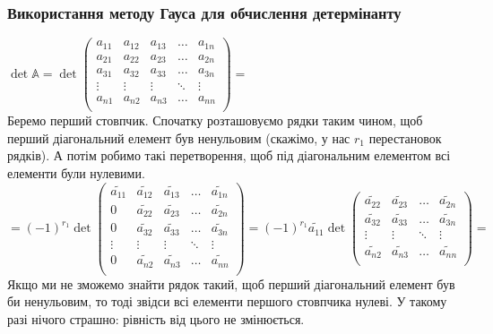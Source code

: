\documentclass[a4paper, 10pt]{article}
\theoremstyle{theoremdd}
\begin{document}
\subsubsection*{Використання методу Гауса для обчислення детермінанту}
$\det \mathbb{A} = \det \begin{pmatrix} 
a_{11} & a_{12} & a_{13} & \dots & a_{1n} \\
a_{21} & a_{22} & a_{23} & \dots & a_{2n} \\
a_{31} & a_{32} & a_{33} & \dots & a_{3n} \\
\vdots & \vdots & \vdots & \ddots & \vdots \\
a_{n1} & a_{n2} & a_{n3} & \dots & a_{nn} \\
\end{pmatrix} = $\\
Беремо перший стовпчик. Спочатку розташовуємо рядки таким чином, щоб перший діагональний елемент був ненульовим (скажімо, у нас $r_1$ перестановок рядків). А потім робимо такі перетворення, щоб під діагональним елементом всі елементи були нулевими.\\
$= (-1)^{r_1} \det \begin{pmatrix}
\widetilde{a_{11}} & \widetilde{a_{12}} & \widetilde{a_{13}} & \dots & \widetilde{a_{1n}} \\
0 & \widetilde{a_{22}} & \widetilde{a_{23}} & \dots & \widetilde{a_{2n}} \\
0 & \widetilde{a_{32}} & \widetilde{a_{33}} & \dots & \widetilde{a_{3n}} \\
\vdots & \vdots & \vdots & \ddots & \vdots \\
0 & \widetilde{a_{n2}} & \widetilde{a_{n3}} & \dots & \widetilde{a_{nn}} \\
\end{pmatrix} = (-1)^{r_1} \tilde{a_{11}} \det \begin{pmatrix}
\widetilde{a_{22}} & \widetilde{a_{23}} & \dots & \widetilde{a_{2n}} \\
\widetilde{a_{32}} & \widetilde{a_{33}} & \dots & \widetilde{a_{3n}} \\
\vdots & \vdots & \ddots & \vdots \\
\widetilde{a_{n2}} & \widetilde{a_{n3}} & \dots & \widetilde{a_{nn}} \\
\end{pmatrix} \boxed{=}$\\
Якщо ми не зможемо знайти рядок такий, щоб перший діагональний елемент був би ненульовим, то тоді звідси всі елементи першого стовпчика нулеві. У такому разі нічого страшно: рівність від цього не змінюється.
\end{document}
